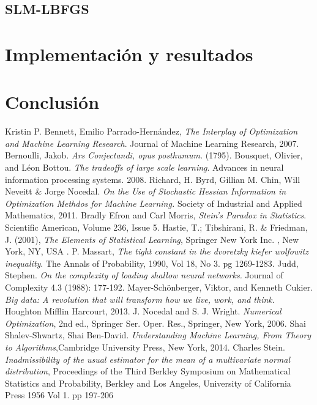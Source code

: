 \documentclass{book}
\theoremstyle{plain}
\theoremstyle{definition}
\theoremstyle{remark}
\begin{document}
\section{SLM-LBFGS}

\chapter{Implementación y resultados}

\chapter{Conclusión}


\begin{thebibliography}{9}
 Kristin P. Bennett, Emilio Parrado-Hernández, \emph{The Interplay of Optimization and Machine Learning Research}. Journal of Machine Learning Research, 2007.
Bernoulli, Jakob. \emph{Ars Conjectandi, opus posthumum.} (1795).
Bousquet, Olivier, and Léon Bottou. \emph{The tradeoffs of large scale learning}. Advances in neural information processing systems. 2008.
 Richard, H. Byrd, Gillian M. Chin, Will Neveitt \& Jorge Nocedal.
  \emph{On the Use of Stochastic Hessian Information in Optimization Methdos for Machine Learning.} Society of Industrial and Applied Mathematics, 2011.
 Bradly Efron and Carl Morris, \emph{Stein's Paradox in Statistics}. Scientific American, Volume 236, Issue 5.
 Hastie, T.; Tibshirani, R. \& Friedman, J. (2001), \emph{The Elements of Statistical Learning}, Springer New York Inc. , New York, NY, USA .
 P. Massart, \emph{The tight constant in the dvoretzky kiefer wolfowitz inequality}. The Annals of Probability, 1990, Vol 18, No 3. pg 1269-1283. 
Judd, Stephen. \emph{On the complexity of loading shallow neural networks.} Journal of Complexity 4.3 (1988): 177-192.
 Mayer-Schönberger, Viktor, and Kenneth Cukier. \emph{Big data: A revolution that will transform how we live, work, and think}. Houghton Mifflin Harcourt, 2013.
 J. Nocedal and S. J. Wright. \emph{Numerical Optimization}, 2nd ed., Springer Ser. Oper. Res., Springer, New York, 2006.
 Shai Shalev-Shwartz, Shai Ben-David. \emph{Understanding Machine Learning, From Theory to Algorithms},Cambridge University Press, New York, 2014.
 Charles Stein. \emph{Inadmissibility of the usual estimator for the mean of a multivariate normal distribution}, Proceedings of the Third Berkley Symposium on Mathematical Statistics and Probability, Berkley and Los Angeles, University of California Press 1956 Vol 1. pp 197-206

\end{thebibliography}
\end{document}
